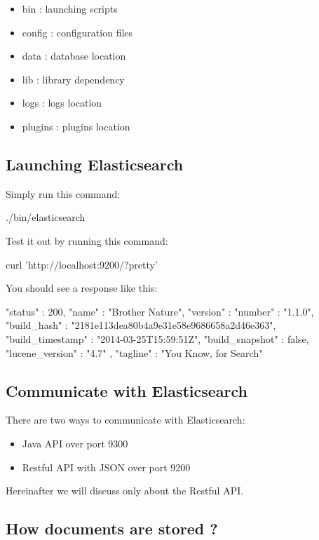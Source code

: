 \documentclass{article}%
\begin{document}
\begin{itemize}
	\item bin : launching scripts
	\item config : configuration files
	\item data : database location
	\item lib : library dependency
	\item logs : logs location
	\item plugins : plugins location
\end{itemize}

\subsection{Launching Elasticsearch}

Simply run this command:
\begin{command}
./bin/elasticsearch
\end{command}

Test it out by running this command:
\begin{command}
curl 'http://localhost:9200/?pretty'
\end{command}

You should see a response like this:
\begin{command}
{
	"status" : 200,
	"name" : "Brother Nature",
	"version" : {
		"number" : "1.1.0",
		"build_hash" : "2181e113dea80b4a9e31e58e9686658a2d46e363",
		"build_timestamp" : "2014-03-25T15:59:51Z",
		"build_snapshot" : false,
		"lucene_version" : "4.7"
	},
	"tagline" : "You Know, for Search"
}
\end{command}

\subsection{Communicate with Elasticsearch}

There are two ways to communicate with Elasticsearch:
\begin{itemize}
	\item Java API over port 9300
	\item Restful API with JSON over port 9200
\end{itemize}

Hereinafter we will discuss only about the Restful API.

\subsection{How documents are stored ?}
\end{document}
